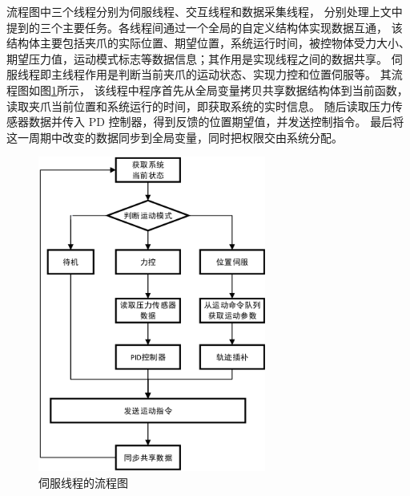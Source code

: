流程图中三个线程分别为伺服线程、交互线程和数据采集线程，
分别处理上文中提到的三个主要任务。各线程间通过一个全局的自定义结构体实现数据互通，
该结构体主要包括夹爪的实际位置、期望位置，系统运行时间，被控物体受力大小、
期望压力值，运动模式标志等数据信息；其作用是实现线程之间的数据共享。
伺服线程即主线程作用是判断当前夹爪的运动状态、实现力控和位置伺服等。
其流程图如图\ref{fig:servo}所示，
该线程中程序首先从全局变量拷贝共享数据结构体到当前函数，
读取夹爪当前位置和系统运行的时间，即获取系统的实时信息。
随后读取压力传感器数据并传入 PD 控制器，得到反馈的位置期望值，并发送控制指令。
最后将这一周期中改变的数据同步到全局变量，同时把权限交由系统分配。

\begin{figure}[!ht]
  \centering
  \includegraphics[width=7.5cm]{chapter03/pic/3-2-a}
  \caption{伺服线程的流程图\label{fig:servo}}
  \vspace{-0.3cm}
\end{figure}


